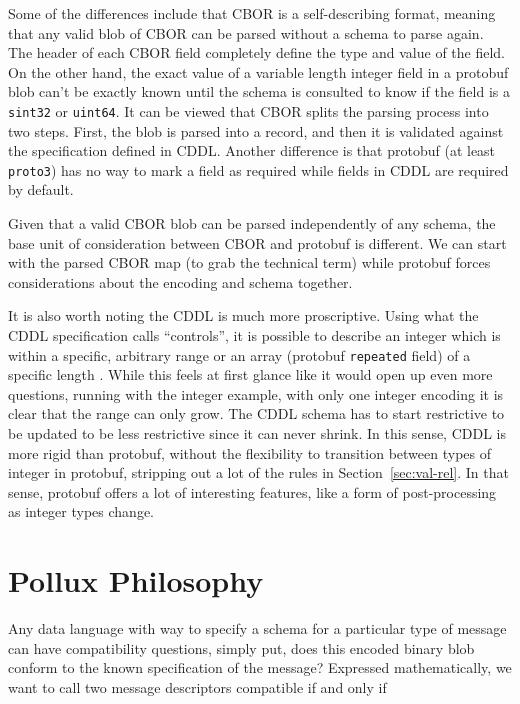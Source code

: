 \documentclass[11pt]{article}
\theoremstyle{definition}
\theoremstyle{plain}
\begin{document}
Some of the differences include that CBOR is a self-describing format, meaning
that any valid blob of CBOR can be parsed without a schema to parse again. The
header of each CBOR field completely define the type and value of the field. On
the other hand, the exact value of a variable length integer field in a protobuf
blob can't be exactly known until the schema is consulted to know if the field
is a \texttt{sint32} or \texttt{uint64}. It can be viewed that CBOR splits the
parsing process into two steps. First, the blob is parsed into a record, and
then it is validated against the specification defined in CDDL. Another
difference is that protobuf (at least \texttt{proto3}) has no way to mark a
field as required while fields in CDDL are required by default.

Given that a valid CBOR blob can be parsed independently of any schema, the base
unit of consideration between CBOR and protobuf is different. We can start with
the parsed CBOR map (to grab the technical term) while protobuf forces
considerations about the encoding and schema together. 

It is also worth noting the CDDL is much more proscriptive. Using what the CDDL
specification calls ``controls'', it is possible to describe an integer which is
within a specific, arbitrary range or an array (protobuf \texttt{repeated}
field) of a specific length \cite{birkholzConciseDataDefinition2019}. While this
feels at first glance like it would open up even more questions, running with
the integer example, with only one integer encoding it is clear that the range
can only grow. The CDDL schema has to start restrictive to be updated to be less
restrictive since it can never shrink. In this sense, CDDL is more rigid than
protobuf, without the flexibility to transition between types of integer in
protobuf, stripping out a lot of the rules in Section~\ref{sec:val-rel}. In that
sense, protobuf offers a lot of interesting features, like a form of
post-processing as integer types change.

\section{Pollux Philosophy}

Any data language with way to specify a schema for a particular type of message
can have compatibility questions, simply put, does this encoded binary blob
conform to the known specification of the message? Expressed mathematically, we
want to call two message descriptors compatible if and only if
\end{document}
